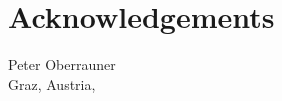 \chapter*{Acknowledgements}


\vspace{2cm}


\begin{flushright}
    Peter Oberrauner \\ {\small Graz, Austria, \thisdate}
\end{flushright}